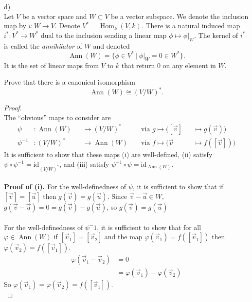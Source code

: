 \documentclass{article}
\newenvironment{problem}[2][Problem]{\begin{trivlist}
\item[\hskip \labelsep {\bfseries #1}\hskip \labelsep {\bfseries #2.}]}{\end{trivlist}}
\begin{document}
\begin{problem}{1} (d) \\
  Let $V$ be a vector space and $W \subset V$ be a vector subspace.
  We denote the inclusion map by $i:W \rightarrow V$.
  Denote $V^* = \operatorname{Hom}_k(V, k)$.
  There is a natural induced map $i^*:V^*\rightarrow W^*$ dual to the inclusion
  sending a linear map $\phi \mapsto \phi|_W$.
  The kernel of $i^*$ is called the \textit{annihilator} of $W$ and denoted \[
    \operatorname{Ann}(W) = \{ \phi \in V^*\ |\ \phi|_W = 0 \in W^* \}.
  \]
  It is the set of linear maps from $V$ to $k$ that return $0$ on any element
  in $W$.

  Prove that there is a canonical isomorphism \[
    \operatorname{Ann}(W) \cong (V/W)^*.
  \]
\end{problem}
\begin{proof} \text{} \\
  The ``obvious'' maps to consider are \begin{alignat*}{4}
    \psi&:\operatorname{Ann}(W) &&\rightarrow (V/W)^* &&\text{ via }
      g \mapsto ([\vec{v}] &&\mapsto g(\vec{v}))\\
    \psi^{-1}&: (V/W)^* &&\rightarrow\operatorname{Ann}(W) &&\text{ via }
      f \mapsto (\vec{v} &&\mapsto f([\vec{v}]))
  \end{alignat*}
  It is sufficient to show that these maps
    (i) are well-defined,
    (ii) satisfy $\psi \circ \psi^{-1} = \mathrm{id}_{(V/W)^*}$, and
    (iii) satisfy $\psi^{-1} \circ \psi = \mathrm{id}_{\operatorname{Ann}(W)}$.
  \\
  \\\textbf{Proof of (i).}
  For the well-definedness of $\psi$, it is sufficient to show that if
  $[\vec{v}] = [\vec{u}]$ then $g(\vec{v}) = g(\vec{u})$.
  Since $\vec{v} - \vec{u} \in W$,
  $g(\vec{v} - \vec{u}) = 0 = g(\vec{v}) - g(\vec{u})$, so
  $g(\vec{v}) = g(\vec{u})$\\ \\
  For the well-definedness of $\psi^-1$, it is sufficient to show that
  for all $\varphi \in \operatorname{Ann}(W)$ if
  $[\vec{v}_1] = [\vec{v}_2]$ and the map $\varphi(\vec{v}_1) = f([\vec{v}_1])$
  then $\varphi(\vec{v}_2) = f([\vec{v}_1])$.
  \begin{align*}
    \varphi(\vec{v}_1 - \vec{v}_2) &= 0 \\
    &= \varphi(\vec{v}_1) - \varphi(\vec{v}_2)
  \end{align*} So $\varphi(\vec{v}_1) = \varphi(\vec{v}_2) = f([\vec{v}_1])$.\\

\end{proof}
\end{document}
